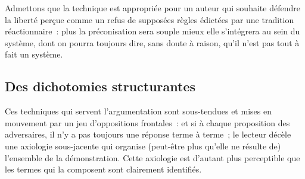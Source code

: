 \documentclass[12pt, a4paper]{article}
\begin{document}
Admettons que la technique est appropriée pour un auteur qui souhaite défendre la liberté perçue comme un refus de supposées règles édictées par une tradition réactionnaire~: plus la préconisation sera souple mieux elle s'intégrera au sein du système, dont on pourra toujours dire, sans doute à raison, qu'il n'est pas tout à fait un système.












\subsection{Des dichotomies structurantes}

Ces techniques qui servent l'argumentation sont sous-tendues et mises en mouvement par un jeu d'oppositions frontales~: et si à chaque proposition des adversaires, il n'y a pas toujours une réponse terme à terme~; le lecteur décèle une axiologie sous-jacente qui organise (peut-être plus qu'elle ne résulte de) l'ensemble de la démonstration. Cette axiologie est d'autant plus perceptible que les termes qui la composent sont clairement identifiés.
\end{document}
